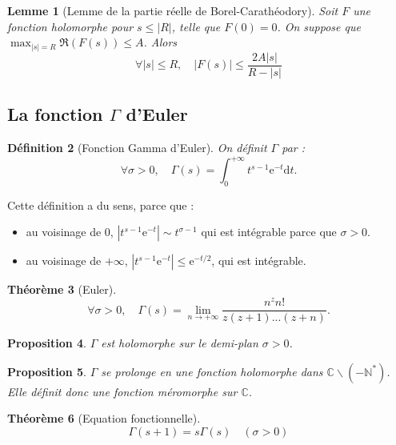 \documentclass[french]{report}
\newtheorem{theorem}{Théorème}[section]
\newtheorem{definition}[theorem]{Définition}
\newtheorem{proposition}[theorem]{Proposition}
\newtheorem{lemma}[theorem]{Lemme}
\begin{document}
\begin{lemma}[Lemme de la partie réelle de Borel-Carathéodory]\label{lem:borel-caratheodory}
  Soit $F$ une fonction holomorphe pour $s\leq|R|$, telle que $F(0)=0$. On suppose que $\max_{|s|=R}\Re(F(s))\leq A$. Alors
  \[
    \forall |s|\leq R,\quad|F(s)|\leq\frac{2A|s|}{R-|s|}  
  \]
\end{lemma}

\subsection{La fonction $\Gamma$ d'Euler}

\begin{definition}[Fonction Gamma d'Euler]
  On définit $\Gamma$ par :
  \[
    \forall \sigma>0,\quad\Gamma(s)=\int_0^{+\infty}t^{s-1}\mathrm{e}^{-t}\mathrm{d}t.
  \]
\end{definition}

Cette définition a du sens, parce que :
\begin{itemize}
  \item au voisinage de 0, $|t^{s-1}\mathrm{e}^{-t}|\sim t^{\sigma-1}$ qui est intégrable parce que $\sigma>0$.
  \item au voisinage de $+\infty$, $|t^{s-1}\mathrm{e}^{-t}|\leq \mathrm{e}^{-t/2}$, qui est intégrable.
\end{itemize}

\begin{theorem}[Euler]
  \[
    \forall \sigma>0,\quad
    \Gamma(s)=\lim_{n\to+\infty}\frac{n^zn!}{z(z+1)...(z+n)}.  
  \]
\end{theorem}

\begin{proposition}
  $\Gamma$ est holomorphe sur le demi-plan $\sigma>0$.
\end{proposition}

\begin{proposition}
  $\Gamma$ se prolonge en une fonction holomorphe dans $\mathbb{C}\backslash(-\mathbb{N}^*)$. Elle définit donc une fonction méromorphe sur $\mathbb{C}$.
\end{proposition}

\begin{theorem}[Equation fonctionnelle]\label{thm:gamma-equation-fonctionnelle}
  \[
    \Gamma(s+1)=s\Gamma(s)\quad(\sigma>0)
  \]
\end{theorem}
\end{document}
